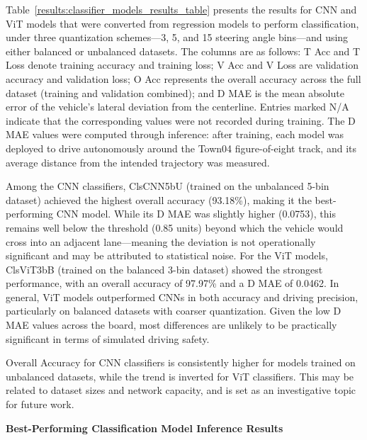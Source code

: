 Table~\ref{results:classifier_models_results_table} presents the results for CNN and ViT models that were converted from regression models to perform classification, under three quantization schemes—3, 5, and 15 steering angle bins—and using either balanced or unbalanced datasets. The columns are as follows: T Acc and T Loss denote training accuracy and training loss; V Acc and V Loss are validation accuracy and validation loss; O Acc represents the overall accuracy across the full dataset (training and validation combined); and D MAE is the mean absolute error of the vehicle’s lateral deviation from the centerline. Entries marked N/A indicate that the corresponding values were not recorded during training. The D MAE values were computed through inference: after training, each model was deployed to drive autonomously around the Town04 figure-of-eight track, and its average distance from the intended trajectory was measured.

Among the CNN classifiers, ClsCNN5bU (trained on the unbalanced 5-bin dataset) achieved the highest overall accuracy (93.18\%), making it the best-performing CNN model. While its D MAE was slightly higher (0.0753), this remains well below the threshold (0.85 units) beyond which the vehicle would cross into an adjacent lane—meaning the deviation is not operationally significant and may be attributed to statistical noise. For the ViT models, ClsViT3bB (trained on the balanced 3-bin dataset) showed the strongest performance, with an overall accuracy of 97.97\% and a D MAE of 0.0462. In general, ViT models outperformed CNNs in both accuracy and driving precision, particularly on balanced datasets with coarser quantization. Given the low D MAE values across the board, most differences are unlikely to be practically significant in terms of simulated driving safety.

Overall Accuracy for CNN classifiers is consistently higher for models trained on unbalanced datasets, while the trend is inverted for ViT classifiers. This may be related to dataset sizes and network capacity, and is set as an investigative topic for future work.


\textbf{Best-Performing Classification Model Inference Results}


